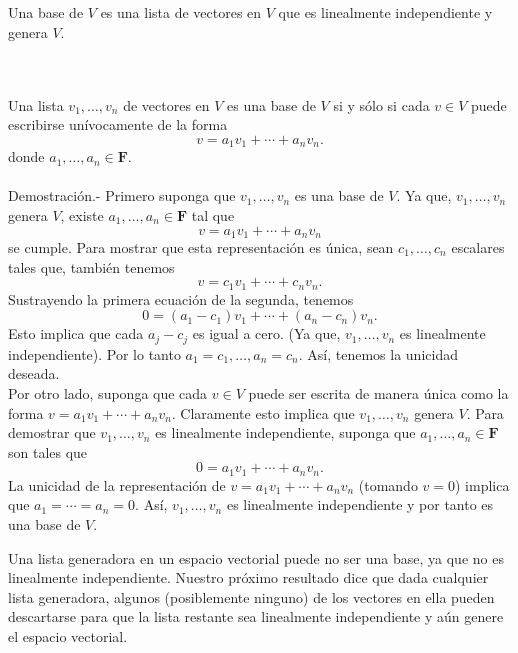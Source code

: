 \vspace{1cm}




\setcounter{mydef}{26}
\begin{mydef}[Base]\;\\\\
    Una base de $V$ es una lista de vectores en $V$ que es linealmente independiente y genera $V$.
\end{mydef}

\begin{myteo}\;\\\\
    Una lista $v_1,\ldots,v_n$ de vectores en $V$ es una base de $V$ si y sólo si cada $v\in V$ puede escribirse unívocamente de la forma 
    $$v=a_1v_1+\cdots+a_nv_n.$$
    donde $a_1,\ldots,a_n\in \textbf{F}$.\\\\
	Demostración.-\; Primero suponga que $v_1,\ldots,v_n$ es una base de $V$. Ya que, $v_1,\ldots,v_n$ genera $V$, existe $a_1,\ldots,a_n\in \textbf{F}$ tal que 
	$$v=a_1v_1+\cdots+a_nv_n$$ 
	se cumple. Para mostrar que esta representación es única, sean $c_1,\ldots,c_n$ escalares tales que, también tenemos
	$$v=c_1v_1+\cdots+c_nv_n.$$
	Sustrayendo la primera ecuación de la segunda, tenemos
	$$0=(a_1-c_1)v_1+\cdots+(a_n-c_n)v_n.$$
	Esto implica que cada $a_j-c_j$ es igual a cero. (Ya que, $v_1,\ldots,v_n$ es linealmente independiente). Por lo tanto $a_1=c_1,\ldots,a_n=c_n$. Así, tenemos la unicidad deseada.\\

	Por otro lado, suponga que cada $v\in V$ puede ser escrita de manera única como la forma $v=a_1v_1+\cdots+a_nv_n$. Claramente esto implica que $v_1,\ldots,v_n$ genera $V$. Para demostrar que $v_1,\ldots,v_n$ es linealmente independiente, suponga que $a_1,\ldots,a_n\in \textbf{F}$ son tales que
	$$0=a_1v_1+\cdots+a_nv_n.$$
	La unicidad de la representación de $v=a_1v_1+\cdots+a_nv_n$ (tomando $v=0$) implica que $a_1=\cdots=a_n=0$. Así, $v_1,\dots,v_n$ es linealmente independiente y por tanto es una base de $V$.
\end{myteo}

Una lista generadora en un espacio vectorial puede no ser una base, ya que no es linealmente independiente. Nuestro próximo resultado dice que dada cualquier lista generadora, algunos (posiblemente ninguno) de los vectores en ella pueden descartarse para que la lista restante sea linealmente independiente y aún genere el espacio vectorial.

